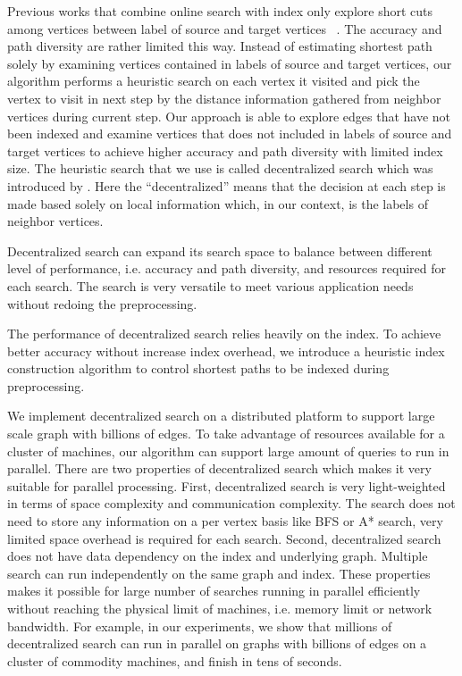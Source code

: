 Previous works that combine online search with index only explore short cuts among vertices between label of source and target vertices ~\cite{Gubichev:2010:FAE:1871437.1871503, 6399472}. The accuracy and path diversity are rather limited this way. Instead of estimating shortest path solely by examining vertices contained in labels of source and target vertices, our algorithm performs a heuristic search on each vertex it visited and pick the vertex to visit in next step by the distance information gathered from neighbor vertices during current step. Our approach is able to explore edges that have not been indexed and examine vertices that does not included in labels of source and target vertices to achieve higher accuracy and path diversity with limited index size. The heuristic search that we use is called decentralized search which was introduced by \cite{Kleinberg:2000p5066}. Here the "`decentralized"' means that the decision at each step is made based solely on local information which, in our context, is the labels of neighbor vertices.

Decentralized search can expand its search space to balance between different level of performance, i.e. accuracy and path diversity, and resources required for each search. The search is very versatile to meet various application needs without redoing the preprocessing.  

The performance of decentralized search relies heavily on the index. To achieve better accuracy without increase index overhead, we introduce a heuristic index construction algorithm to control shortest paths to be indexed during preprocessing. 

We implement decentralized search on a distributed platform to support large scale graph with billions of edges. To take advantage of resources available for a cluster of machines, our algorithm can support large amount of queries to run in parallel. There are two properties of decentralized search which makes it very suitable for parallel processing. First, decentralized search is very light-weighted in terms of space complexity and communication complexity. The search does not need to store any information on a per vertex basis like BFS or A* search, very limited space overhead is required for each search. Second, decentralized search does not have data dependency on the index and underlying graph. Multiple search can run independently on the same graph and index. These properties makes it possible for large number of searches running in parallel efficiently without reaching the physical limit of machines, i.e. memory limit or network bandwidth. For example, in our experiments, we show that millions of decentralized search can run in parallel on graphs with billions of edges on a cluster of commodity machines, and finish in tens of seconds. 

